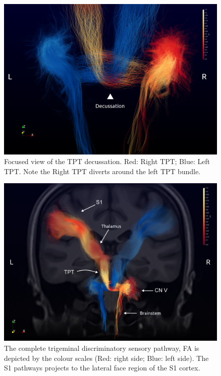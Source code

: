 \begin{figure}[ht]
\centering
\includegraphics[width=\linewidth]{view-decussation.png}
\caption{Focused view of the TPT decussation. Red: Right TPT; Blue: Left TPT. Note the Right TPT diverts around the left TPT bundle. }
\label{fig:GPfigure2}
\end{figure}

\begin{figure}[ht]
\centering
\includegraphics[width=\linewidth]{view-left-right.png}
\caption{The complete trigeminal discriminatory sensory pathway, FA is depicted by the colour scales (Red: right side; Blue: left side). The S1 pathways projects to the lateral face region of the S1 cortex. }
\label{fig:GPfigure3}
\end{figure}

